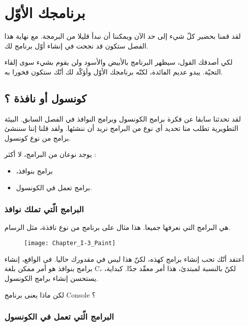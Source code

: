 \chapter{برنامجك الأوّل}

لقد قمنا بحضير كلّ شيء إلى حد الآن ويمكننا أن نبدأ قليلا من البرمجة. مع نهاية هذا الفصل ستكون قد نجحت في إنشاء أوّل برنامج لك.

لكي أصدقك القول، سيظهر البرنامج بالأبيض والأسود ولن يقوم بشيء سوى إلقاء التحيّة. يبدو عديم الفائدة، لكنّه برنامجك الأوّل وأؤكّد لك أنّك ستكون فخورا به.

\section{كونسول أو نافذة ؟}

لقد تحدثنا سابقا عن فكرة برامج الكونسول وبرامج النوافذ في الفصل السابق. البيئة التطويرية تطلب منا تحديد أي نوع من البرامج نريد أن ننشئها. ولقد قلنا إننا سننشئ برامج من نوع كونسول.

يوجد نوعان من البرامج، لا أكثر :

\begin{itemize}
  \item ،برامج بنوافذ
  \item برامج تعمل في الكونسول.
\end{itemize}

\subsection{البرامج الّتي تملك نوافذ}

هي البرامج التي نعرفها جميعا. هذا مثال على برنامج من نوع نافذة، مثل الرسام.

\begin{figure}[H]
	\centering
	\texttt{[image: Chapter\_I-3\_Paint]}
\end{figure}

أعتقد أنّك تحب إنشاء برامج كهذه، لكنّ هذا ليس في مقدورك حاليا. في الواقع، إنشاء برامج بنوافذ هو أمر ممكن بلغة \textenglish{C}، لكنّ بالنسبة لمبتدئ، هذا أمر معقّد جدّا. كبداية، يستحسن إنشاء برامج الكونسول.

\begin{question}
  لكن ماذا يعنى برنامج
\textenglish{Console}
؟
\end{question}

\subsection{البرامج الّتي تعمل في الكونسول}

